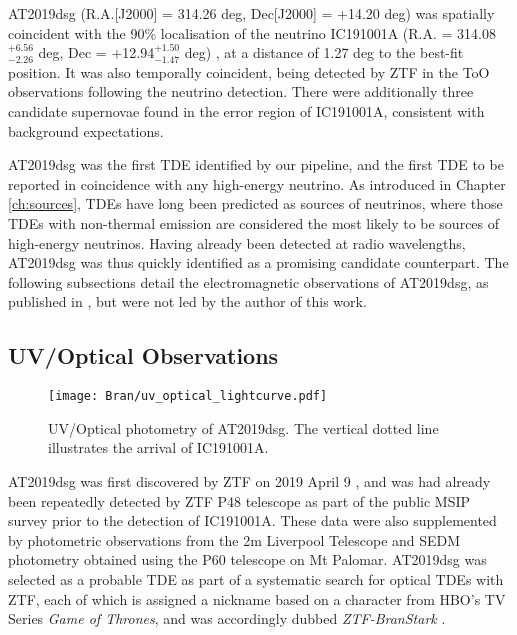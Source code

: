 AT2019dsg (R.A.[J2000] = 314.26 deg, Dec[J2000] = +14.20 deg) was spatially coincident with the 90\% localisation of the neutrino IC191001A (R.A. = 314.08$^{+6.56}_{-2.26}$ deg,  Dec = +12.94$^{+1.50}_{-1.47}$ deg) \cite{ic191001a}, at a distance of 1.27 deg to the best-fit position. It was also temporally coincident, being detected by ZTF in the ToO observations following the neutrino detection. There were additionally three candidate supernovae found in the error region of IC191001A, consistent with background expectations. 

AT2019dsg was the first TDE identified by our pipeline, and the first TDE to be reported in coincidence with any high-energy neutrino. As introduced in Chapter \ref{ch:sources}, TDEs have long been predicted as sources of neutrinos, where those TDEs with non-thermal emission are considered the most likely to be sources of high-energy neutrinos. Having already been detected at radio wavelengths, AT2019dsg was thus quickly identified as a promising candidate counterpart. The following subsections detail the electromagnetic observations of AT2019dsg, as published in \cite{bran}, but were not led by the author of this work.

\subsection*{UV/Optical Observations}

\begin{figure}[!ht]
	\texttt{[image: Bran/uv\_optical\_lightcurve.pdf]}
	\caption{UV/Optical photometry of AT2019dsg. The vertical dotted line illustrates the arrival of IC191001A.}
	\label{fig:bran_optical_lightcurve}
\end{figure}

AT2019dsg was first discovered by ZTF on 2019 April 9 , and was had already been repeatedly detected by ZTF P48 telescope as part of the public MSIP survey prior to the detection of IC191001A.  These data were also supplemented by photometric observations from the 2m Liverpool Telescope  and SEDM  photometry obtained using the P60 telescope on Mt Palomar. AT2019dsg was selected as a probable TDE as part of a systematic search for optical TDEs with ZTF, each of which is assigned a nickname based on a character from HBO's TV Series \emph{Game of Thrones}, and was accordingly dubbed \emph{ZTF-BranStark} .

